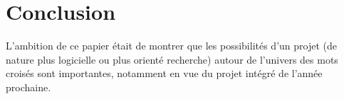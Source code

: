 \documentclass{article}
\begin{document}
\section{Conclusion}

L'ambition de ce papier était de montrer que les possibilités d'un projet (de nature plus logicielle ou plus orienté recherche) autour de l'univers des mots croisés sont importantes, notamment en vue du projet intégré de l'année prochaine.



\end{document}
